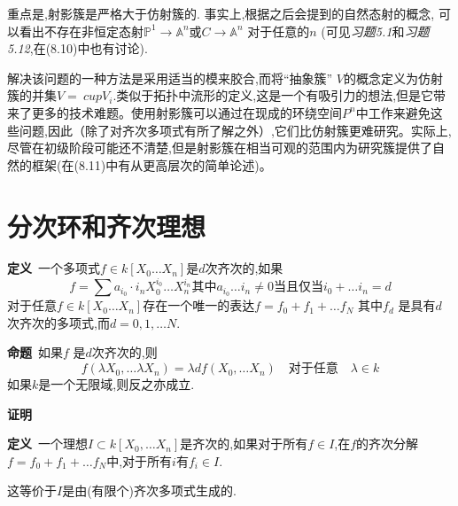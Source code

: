 \documentclass[UTF8]{book}
\begin{document}
		
		重点是,射影簇是严格大于仿射簇的. 事实上,根据之后会提到的自然态射的概念, 可以看出不存在非恒定态射$\mathbb{P} ^{1} \rightarrow \mathbb{A} ^{n}$或$C \rightarrow \mathbb{A}^{n}$ 对于任意的$n$ (可见\textit{习题5.1}和\textit{习题5.12},在(8.10)中也有讨论).
		
		
		解决该问题的一种方法是采用适当的模来胶合,而将“抽象簇” $ V $的概念定义为仿射簇的并集$ V = \ cup V _ {i} $.类似于拓扑中流形的定义,这是一个有吸引力的想法,但是它带来了更多的技术难题。使用射影簇可以通过在现成的环绕空间$ P ^ {n}$中工作来避免这些问题,因此（除了对齐次多项式有所了解之外）,它们比仿射簇更难研究。实际上,尽管在初级阶段可能还不清楚,但是射影簇在相当可观的范围内为研究簇提供了自然的框架(在(8.11)中有从更高层次的简单论述)。
		
	\section{分次环和齐次理想}
		\textbf{定义}\ 一个多项式$f \in k \left[ X _{0} \ldots X _{ n }\right]$是$ d $次齐次的,如果
		\begin{equation*}
			f =\sum a _{ i _{0}} \cdot i _{ n } X _{0}^{ i _{0}} \ldots X _{ n }^{ i _{ n }} \text{其中} a _{ i _{0}} \ldots i _{ n } \neq 0 \text{当且仅当} i _{0}+\ldots i _{ n }= d
		\end{equation*}
		对于任意$f \in k \left[ X _{0} \ldots X _{ n }\right]$存在一个唯一的表达$f = f _{0}+ f _{1}+\ldots f _{ N }$ 其中$f _{ d }$ 是具有$ d $次齐次的多项式,而$d =0,1, \ldots N$.
		
		
		\textbf{命题}\ 如果$f$ 是$ d $次齐次的,则
		\begin{equation*}
		f \left(\lambda X _{0}, \ldots \lambda X _{ n }\right)=\lambda d f \left( X _{0}, \ldots X _{ n }\right) \quad \text {对于任意} \quad \lambda \in k
		\end{equation*}
		如果$k$是一个无限域,则反之亦成立.
		
		
		\textbf{证明}\ 
		
		
		\textbf{定义}\ 一个理想$I \subset k \left[ X _{0}, \ldots X _{ n }\right]$是齐次的,如果对于所有$f \in I$,在$ f $的齐次分解$f = f _{0}+ f _{1}+\ldots f _{ N }$中,对于所有$ i $有$f _{ i } \in I$.
		
		
		这等价于$ I $是由(有限个)齐次多项式生成的.
		
		
\end{document}
